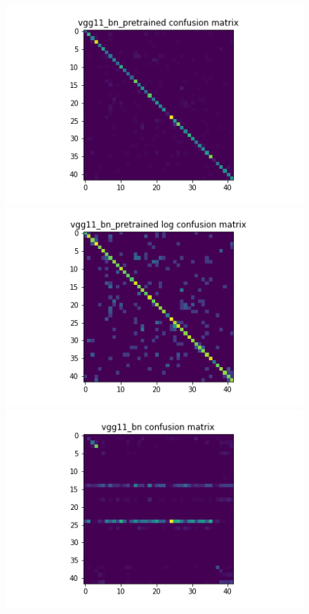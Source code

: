 \begin{figure}[t]
  \begin{minipage}[b]{.5\linewidth}
    \centering
    \includegraphics[width=1.2\textwidth]{figs/conf_matrix/vgg11_bn_pretrained_conf.png}
  \end{minipage}
  \hfill
  \begin{minipage}[b]{.5\linewidth}
    \centering
    \includegraphics[width=1.2\textwidth]{figs/conf_matrix/vgg11_bn_pretrained_log_conf.png}
  \end{minipage}
  \vfill
  \begin{minipage}[b]{.5\linewidth}
    \centering
    \includegraphics[width=1.2\textwidth]{figs/conf_matrix/vgg11_bn_conf.png}

\end{minipage}
\end{figure}

